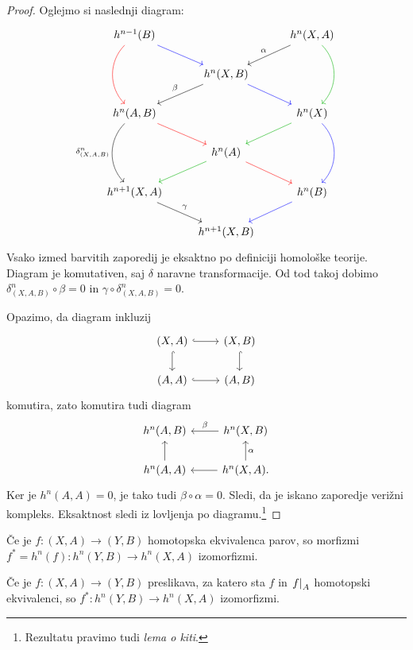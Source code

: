 \begin{proof}
Oglejmo si naslednji diagram:
\[
\begin{tikzcd}
h^{n-1}(B) \arrow[dr, blue] \arrow[dd, out=225, in=135, red]&
&
h^n(X,A) \arrow[dl, "\alpha"']
\arrow[dd, out=315, in=45, green!70!black]
\\
&
h^n(X,B) \arrow[dl, "\beta"'] \arrow[dr, blue]
\\
h^n(A,B) \arrow[dr, red]
\arrow[dd, out=225, in=135, "\delta_{(X,A,B)}^n"'] &
&
h^n(X) \arrow[dl, green!70!black] \arrow[dd, out=315, in=45, blue]
\\
&
h^n(A) \arrow[dl, green!70!black] \arrow[dr, red]
\\
h^{n+1}(X,A) \arrow[dr, "\gamma"] &
&
h^n(B) \arrow[dl, blue]
\\
&
h^{n+1}(X,B)
\end{tikzcd}
\]
Vsako izmed barvitih zaporedij je eksaktno po definiciji homološke
teorije. Diagram je komutativen, saj $\delta$ naravne
transformacije. Od tod takoj dobimo
$\delta_{(X,A,B)}^n \circ \beta = 0$ in
$\gamma \circ \delta_{(X,A,B)}^n = 0$.

Opazimo, da diagram inkluzij
\[
\begin{tikzcd}
(X,A) \arrow[r, hook] \arrow[d, hook] & (X,B) \arrow[d, hook] \\
(A,A) \arrow[r, hook] & (A,B)
\end{tikzcd}
\]
komutira, zato komutira tudi diagram
\[
\begin{tikzcd}
h^n(A,B) & h^n(X,B) \arrow[l, "\beta"'] \\
h^n(A,A) \arrow[u] & h^n(X,A). \arrow[u, "\alpha"'] \arrow[l]
\end{tikzcd}
\]
Ker je $h^n(A,A) = 0$, je tako tudi $\beta \circ \alpha = 0$.
Sledi, da je iskano zaporedje verižni kompleks. Eksaktnost sledi iz
lovljenja po diagramu.\footnote{Rezultatu pravimo tudi
\emph{lema o kiti}.}
\end{proof}


\begin{trditev}
Če je $f \colon (X, A) \to (Y, B)$ homotopska ekvivalenca parov, so
morfizmi $f^* = h^n(f) \colon h^n(Y, B) \to h^n(X, A)$ izomorfizmi.
\end{trditev}

\obvs

\begin{trditev}
Če je $f \colon (X, A) \to (Y, B)$ preslikava, za katero sta
$f$ in $\left. f\right|_{A}^{}$ homotopski ekvivalenci, so
$f^* \colon h^n(Y, B) \to h^n(X, A)$ izomorfizmi.
\end{trditev}

